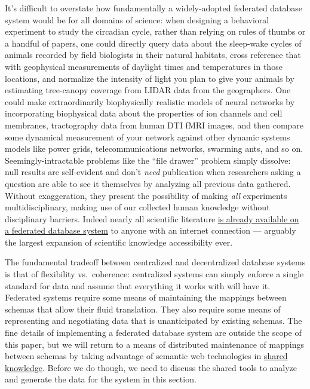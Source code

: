 \documentclass[11pt]{article}
\begin{document}
\begin{multicols}{2}
It's difficult to overstate how fundamentally a widely-adopted federated
database system would be for all domains of science: when designing a
behavioral experiment to study the circadian cycle, rather than relying
on rules of thumbs or a handful of papers, one could directly query data
about the sleep-wake cycles of animals recorded by field biologists in
their natural habitats, cross reference that with geophysical
measurements of daylight times and temperatures in those locations, and
normalize the intensity of light you plan to give your animals by
estimating tree-canopy coverage from LIDAR data from the geographers.
One could make extraordinarily biophysically realistic models of neural
networks by incorporating biophysical data about the properties of ion
channels and cell membranes, tractography data from human DTI fMRI
images, and then compare some dynamical measurement of your network
against other dynamic systems models like power grids,
telecommunications networks, swarming ants, and so on.
Seemingly-intractable problems like the ``file drawer'' problem simply
dissolve: null results are self-evident and don't \emph{need}
publication when researchers asking a question are able to see it
themselves by analyzing all previous data gathered. Without
exaggeration, they present the possibility of making \emph{all}
experiments multidisciplinary, making use of our collected human
knowledge without disciplinary barriers. Indeed nearly all scientific
literature \href{https://freeread.org/ipfs/}{is already available on a
federated database system} to anyone with an internet connection ---
arguably the largest expansion of scientific knowledge accessibility
ever.

The fundamental tradeoff between centralized and decentralized database
systems is that of flexibility vs.~coherence: centralized systems can
simply enforce a single standard for data and assume that everything it
works with will have it. Federated systems require some means of
maintaining the mappings between schemas that allow their fluid
translation. They also require some means of representing and
negotiating data that is unanticipated by existing schemas. The fine
details of implementing a federated database system are outside the
scope of this paper, but we will return to a means of distributed
maintenance of mappings between schemas by taking advantage of semantic
web technologies in \protect\hyperlink{shared-knowledge}{shared
knowledge}. Before we do though, we need to discuss the shared tools to
analyze and generate the data for the system in this section.


\end{multicols}
\end{document}
